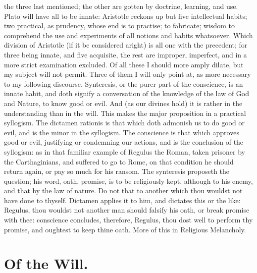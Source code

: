 {the three last mentioned; the other are gotten by doctrine, learning,
and use. Plato will have all to be innate: Aristotle reckons up but
five intellectual habits; two practical, as prudency, whose end is to
practise; to fabricate; wisdom to comprehend the use and experiments of
all notions and habits whatsoever. Which division of Aristotle (if it
be considered aright) is all one with the precedent; for three being
innate, and five acquisite, the rest are improper, imperfect, and in a
more strict examination excluded. Of all these I should more amply
dilate, but my subject will not permit. Three of them I will only point
at, as more necessary to my following discourse.
Synteresis, or the purer part of the conscience, is an innate habit,
and doth signify a conversation of the knowledge of the law of God and
Nature, to know good or evil. And (as our divines hold) it is rather in
the understanding than in the will. This makes the major proposition in
a practical syllogism. The dictamen rationis is that which doth
admonish us to do good or evil, and is the minor in the syllogism. The
conscience is that which approves good or evil, justifying or
condemning our actions, and is the conclusion of the syllogism: as in
that familiar example of Regulus the Roman, taken prisoner by the
Carthaginians, and suffered to go to Rome, on that condition he should
return again, or pay so much for his ransom. The synteresis proposeth
the question; his word, oath, promise, is to be religiously kept,
although to his enemy, and that by the law of nature. Do not that
to another which thou wouldst not have done to thyself. Dictamen
applies it to him, and dictates this or the like: Regulus, thou wouldst
not another man should falsify his oath, or break promise with thee:
conscience concludes, therefore, Regulus, thou dost well to perform thy
promise, and oughtest to keep thine oath. More of this in Religious
Melancholy.

\section{Of the Will.}

}
